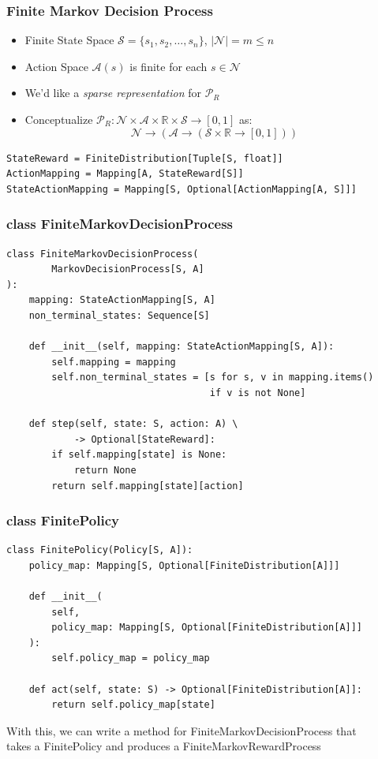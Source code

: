 \documentclass[handout]{beamer}
\begin{document}
\begin{frame}[fragile]
\frametitle{Finite Markov Decision Process}
\pause
\begin{itemize}[<+->]
\item Finite State Space $\mathcal{S} = \{s_1, s_2, \ldots, s_n\}$, $|\mathcal{N}| = m\leq n$
\item Action Space $\mathcal{A}(s)$ is finite for each $s \in \mathcal{N}$
\item We'd like a {\em sparse representation} for $\mathcal{P}_R$
\item Conceptualize $\mathcal{P}_R : \mathcal{N} \times \mathcal{A} \times \mathbb{R} \times \mathcal{S} \rightarrow [0, 1]$ as:
$$\mathcal{N} \rightarrow (\mathcal{A} \rightarrow (\mathcal{S} \times \mathbb{R} \rightarrow [0, 1]))$$
\end{itemize}
\pause
\begin{lstlisting}
StateReward = FiniteDistribution[Tuple[S, float]]
ActionMapping = Mapping[A, StateReward[S]]
StateActionMapping = Mapping[S, Optional[ActionMapping[A, S]]]
\end{lstlisting}
\end{frame}


\begin{frame}[fragile]
\frametitle{class FiniteMarkovDecisionProcess}
\pause
\begin{lstlisting}
class FiniteMarkovDecisionProcess(
        MarkovDecisionProcess[S, A]
):
    mapping: StateActionMapping[S, A]
    non_terminal_states: Sequence[S]

    def __init__(self, mapping: StateActionMapping[S, A]):
        self.mapping = mapping
        self.non_terminal_states = [s for s, v in mapping.items()
                                    if v is not None]

    def step(self, state: S, action: A) \
            -> Optional[StateReward]:
        if self.mapping[state] is None:
            return None
        return self.mapping[state][action]                                
\end{lstlisting}                                    
\end{frame}

\begin{frame}[fragile]
\frametitle{class FinitePolicy}
\pause
\begin{lstlisting}
class FinitePolicy(Policy[S, A]):
    policy_map: Mapping[S, Optional[FiniteDistribution[A]]]

    def __init__(
        self,
        policy_map: Mapping[S, Optional[FiniteDistribution[A]]]
    ):
        self.policy_map = policy_map

    def act(self, state: S) -> Optional[FiniteDistribution[A]]:
        return self.policy_map[state]                           
\end{lstlisting}

With this, we can write a method for FiniteMarkovDecisionProcess that \\
takes a FinitePolicy and produces a FiniteMarkovRewardProcess                                 
\end{frame}
\end{document}
